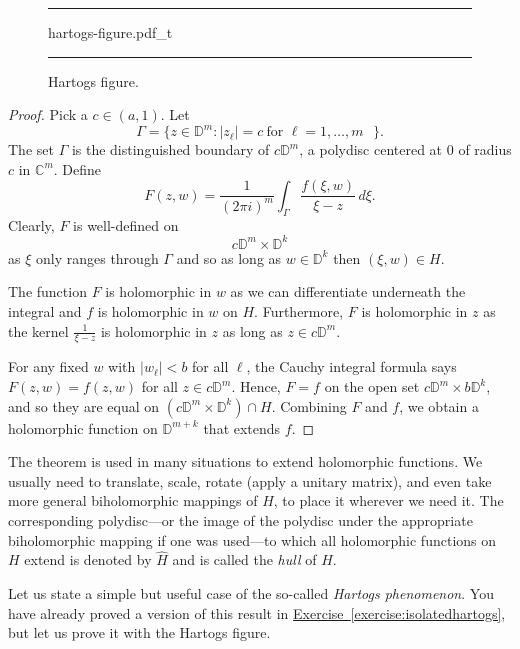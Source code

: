 \documentclass[12pt,openany]{book}
\newcommand{\sabs}[1]{\lvert {#1} \rvert}
\newcommand{\C}{{\mathbb{C}}}
\newcommand{\D}{{\mathbb{D}}}
\newcommand{\myindex}[1]{#1\index{#1}}
\theoremstyle{plain}
\theoremstyle{remark}
\theoremstyle{definition}
\newenvironment{myfig}{%
\begin{figure}[h!t]
\noindent\rule{\textwidth}{0.5pt}\vspace{12pt}\par\centering}%
{\par\noindent\rule{\textwidth}{0.5pt}
\end{figure}}
\theoremstyle{exercise}
\theoremstyle{example}
\newcommand{\exerciseref}[1]{\hyperref[#1]{Exercise~\ref*{#1}}}
\begin{document}
\begin{myfig}
\newcommand{\hartogstext}{\parbox[t]{2.3in}{In diagrams, the Hartogs figure is
often drawn as:}}
{hartogs-figure.pdf_t}
\caption{Hartogs figure.\label{fig:hartogs-figure}}
\end{myfig}

\begin{proof}
Pick a $c \in (a,1)$.  Let
\begin{equation*}
\Gamma =
\bigl\{ z \in \D^{m} : \sabs{z_\ell} = c ~\text{for $\ell=1,\ldots,m$ } \bigr\}.
\end{equation*}
The set $\Gamma$ is the distinguished boundary of $c \D^m$,
a polydisc centered at $0$ of radius $c$ in $\C^m$.
Define
\begin{equation*}
F(z,w)
=
\frac{1}{{(2\pi i)}^m}
\int_\Gamma \frac{f(\xi,w)}{\xi-z} \, d\xi .
\end{equation*}
Clearly, $F$ is well-defined on
\begin{equation*}
c\D^m \times \D^k
\end{equation*}
as $\xi$ only
ranges through $\Gamma$ and so as long as $w \in \D^k$ then $(\xi,w) \in H$.

The function $F$ is holomorphic in $w$ as we can differentiate
underneath the integral and $f$ is holomorphic in $w$ on $H$.  Furthermore,
$F$ is holomorphic in $z$ as the kernel $\frac{1}{\xi-z}$ is holomorphic in
$z$ as long as $z \in c\D^m$.

For any fixed $w$ with $\sabs{w_\ell} < b$ for all $\ell$,
the Cauchy integral formula says
$F(z,w) = f(z,w)$ for all $z \in c \D^m$.
Hence, $F=f$ on the open set
$c\D^m \times b\D^k$,
and so they are equal on
$(c\D^m \times \D^k) \cap H$.
Combining $F$ and $f$, we obtain a holomorphic
function on $\D^{m+k}$ that extends $f$.
\end{proof}

The theorem is used in many situations to extend holomorphic functions.
We usually need to translate, scale, rotate (apply a unitary matrix),
and even take more general biholomorphic mappings
of $H$, to place it wherever we need it.
The corresponding polydisc---or the image of
the polydisc under the appropriate biholomorphic mapping if one was
used---to which all holomorphic functions on $H$ extend is denoted
by $\widehat{H}$ and is called the \emph{hull} of $H$.%

Let us state a simple but useful case of the so-called
\emph{\myindex{Hartogs phenomenon}}.  You have already proved a version of
this result in \exerciseref{exercise:isolatedhartogs}, but let us prove it
with the Hartogs figure.
\end{document}

